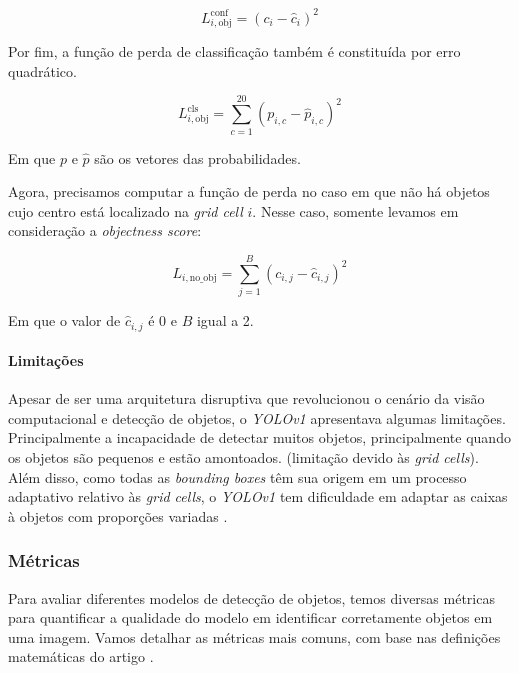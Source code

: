 \begin{center}
\[
L_{i, \text{obj}}^{\text{conf}} =  (c_i - \hat{c}_i)^2
\]
\end{center}

Por fim, a função de perda de classificação também é constituída por erro quadrático.

\begin{center}
\[
L_{i, \text{obj}}^{\text{cls}} = \sum_{c=1}^{20} (p_{i,c} - \hat{p}_{i,c})^2
\]
\end{center}

Em que $p$ e $\hat{p}$ são os vetores das probabilidades.

Agora, precisamos computar a função de perda no caso em que não há objetos cujo centro está localizado na \emph{grid cell} $i$. Nesse caso, somente levamos em consideração a \emph{objectness score}:

\begin{center}
\[
L_{i, \text{no\_obj}} = \sum_{j=1}^{B} (c_{i,j} - \hat{c}_{i,j})^2
\]
\end{center}

Em que o valor de $\hat{c}_{i,j}$ é 0 e $B$ igual a 2.

\paragraph{Limitações}
Apesar de ser uma arquitetura disruptiva que revolucionou o cenário da visão computacional e detecção de objetos, o \emph{YOLOv1} apresentava algumas limitações. Principalmente a incapacidade de detectar muitos objetos, principalmente quando os objetos são pequenos e estão amontoados. (limitação devido às \emph{grid cells}). Além disso, como todas as \emph{bounding boxes} têm sua origem em um processo adaptativo relativo às \emph{grid cells}, o \emph{YOLOv1} tem dificuldade em adaptar as caixas à objetos com proporções variadas \citep{yolo_review}.

\subsubsection{Métricas}
Para avaliar diferentes modelos de detecção de objetos, temos diversas métricas para quantificar a qualidade do modelo em identificar corretamente objetos em uma imagem. Vamos detalhar as métricas mais comuns, com base nas definições matemáticas do artigo \citep{Padilla2020A}.


